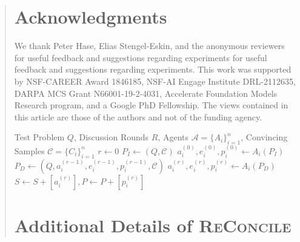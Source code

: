 \documentclass[11pt]{article}
\newcommand{\method}[0]{\textsc{ReConcile}}
\begin{document}
\begin{abstract}
\section*{Acknowledgments}
We thank Peter Hase, Elias Stengel-Eskin, and the anonymous
reviewers for useful feedback and suggestions regarding
experiments for useful feedback and suggestions regarding experiments. This work was supported by NSF-CAREER Award 1846185, NSF-AI Engage Institute DRL-2112635, DARPA MCS Grant N66001-19-2-4031, Accelerate Foundation Models Research program, and a Google PhD Fellowship. The views contained in this article are those of the authors and not of the funding agency.
\clearpage
\begin{algorithm*}[ht]
\small
\caption{\method{}: A Group-Discuss-And-Convince Framework}\label{alg:RTC}
\begin{algorithmic}
\Require Test Problem $Q$, Discussion Rounds $R$, Agents $\mathcal{A} = \{A_i\}_{i=1}^{n}$, Convincing Samples $\mathcal{C} = \{C_i\}_{i=1}^{n}$
\Function{\method{}}{$Q, R, \mathcal{A}, \mathcal{C}$}
\State $r \gets 0$                         
\State $P_I \gets (Q, \mathcal{C})$                               
\State $a_i^{(0)}, e_i^{(0)}, p_i^{(0)} \gets A_i(P_I)$             
\Else
\State $P_D \gets (Q, a_i^{(r-1)}, e_i^{(r-1)}, p_i^{(r-1)}, \mathcal{C})$     
\State $a_i^{(r)}, e_i^{(r)}, p_i^{(r)} \gets A_i(P_D)$
\EndIf
\State $S \gets S + [a_i^{(r)}], P \gets P + [p_i^{(r)}]$         
\EndFor
{}      
\EndWhile
\State {}                                
\EndFunction
\end{algorithmic}
\end{algorithm*}

\section{Additional Details of \method{}}

\end{abstract}
\end{document}
